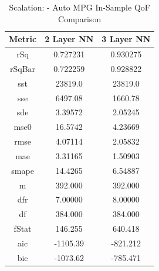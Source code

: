 \documentclass{article}
\begin{document}
\begin{table}[H]
\centering
\caption{Scalation: - Auto MPG In-Sample QoF Comparison}
\label{tab:Scalation: - Auto MPG In-Sample QoF Comparison}
\begin{tabular}{|c|c|c|} \hline 
Metric & 2 Layer NN & 3 Layer NN \\ \hline \hline 
rSq & 0.727231 & 0.930275 \\ \hline 
rSqBar & 0.722259 & 0.928822 \\ \hline 
sst & 23819.0 & 23819.0 \\ \hline 
sse & 6497.08 & 1660.78 \\ \hline 
sde & 3.39572 & 2.05245 \\ \hline 
mse0 & 16.5742 & 4.23669 \\ \hline 
rmse & 4.07114 & 2.05832 \\ \hline 
mae & 3.31165 & 1.50903 \\ \hline 
smape & 14.4265 & 6.54887 \\ \hline 
m & 392.000 & 392.000 \\ \hline 
dfr & 7.00000 & 8.00000 \\ \hline 
df & 384.000 & 384.000 \\ \hline 
fStat & 146.255 & 640.418 \\ \hline 
aic & -1105.39 & -821.212 \\ \hline 
bic & -1073.62 & -785.471 \\ \hline 
\end{tabular}
\end{table}
\end{document}
